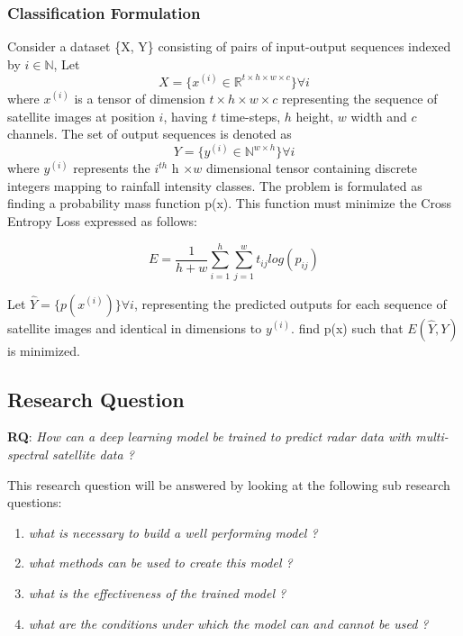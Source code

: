 \subsubsection[short]{Classification Formulation}
Consider a dataset \{X, Y\} consisting of pairs of input-output sequences indexed by $i \in \mathbb{N}$,
Let $$X = \{x^{(i)} \in \mathbb{R}^{t \times h \times w \times c}\} \forall i$$ 
where $x^{(i)}$ is a tensor of dimension $t \times h \times w \times c$ representing the sequence of satellite images at position $i$, having $t$ time-steps, $h$ height, $w$ width and $c$ channels.
The set of output sequences is denoted as $$Y = \{y^{(i)} \in \mathbb{N}^{w\times h}\}\forall i$$
where $y^{(i)}$ represents the $i^{th}$ h $\times w$ dimensional tensor containing discrete integers mapping to rainfall intensity classes.
The problem is formulated as finding a probability mass function p(x). This function must minimize the Cross Entropy Loss expressed as follows:

$$E = \frac{1}{h+w}\sum_{i=1}^h\sum_{j=1}^w t_{ij} log(p_{ij})$$

Let $\hat{Y} = \{p(x^{(i)})\}\forall i$, representing the predicted outputs for each sequence of satellite images and identical in dimensions to $y^{(i)}$.
find p(x) such that $E(\hat{Y}, Y)$ is minimized.

\subsection{Research Question}
\textbf{RQ}: \textit{How can a deep learning model be trained to predict radar data with multi-spectral satellite data ?}
\smallskip

This research question will be answered by looking at the following sub research questions:
\begin{enumerate}
    \item \textit{what is necessary to build a well performing model ?}
    \item \textit{what methods can be used to create this model ?}
    \item \textit{what is the effectiveness of the trained model ?}
    \item \textit{what are the conditions under which the model can and cannot be used ?}
\end{enumerate}
